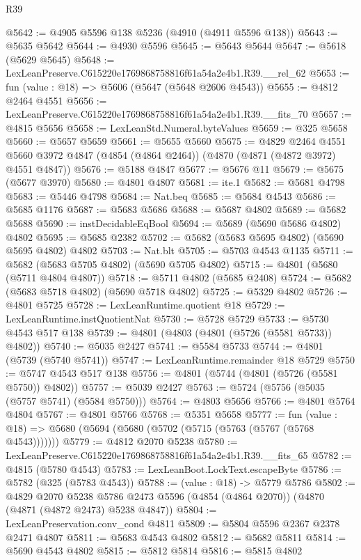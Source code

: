 \begin{lexlean}{R39}
\begin{coremodule}
@5642 := @4905 @5596 @138 @5236 (@4910 (@4911 @5596 @138))
@5643 := @5635 @5642
@5644 := @4930 @5596
@5645 := @5643 @5644
@5647 := @5618 (@5629 @5645)
@5648 := LexLeanPreserve.C615220e1769868758816f61a54a2e4b1.R39.__rel_62
@5653 := fun (value : @18) => @5606 (@5647 (@5648 @2606 @4543))
@5655 := @4812 @2464 @4551
@5656 := LexLeanPreserve.C615220e1769868758816f61a54a2e4b1.R39.__fits_70
@5657 := @4815 @5656
@5658 := LexLeanStd.Numeral.byteValues
@5659 := @325 @5658
@5660 := @5657 @5659
@5661 := @5655 @5660
@5675 := @4829
    @2464
    @4551
    @5660
    @3972
    @4847
    (@4854 (@4864 @2464))
    (@4870 (@4871 (@4872 @3972) @4551 @4847))
@5676 := @5188 @4847
@5677 := @5676 @11
@5679 := @5675 (@5677 @3970)
@5680 := @4801 @4807
@5681 := ite.{1}
@5682 := @5681 @4798
@5683 := @5446 @4798
@5684 := Nat.beq
@5685 := @5684 @4543
@5686 := @5685 @1176
@5687 := @5683 @5686
@5688 := @5687 @4802
@5689 := @5682 @5688
@5690 := instDecidableEqBool
@5694 := @5689 (@5690 @5686 @4802) @4802
@5695 := @5685 @2382
@5702 := @5682 (@5683 @5695 @4802) (@5690 @5695 @4802) @4802
@5703 := Nat.blt
@5705 := @5703 @4543 @1135
@5711 := @5682 (@5683 @5705 @4802) (@5690 @5705 @4802)
@5715 := @4801 (@5680 (@5711 @4804 @4807))
@5718 := @5711 @4802 (@5685 @2408)
@5724 := @5682 (@5683 @5718 @4802) (@5690 @5718 @4802)
@5725 := @5329 @4802
@5726 := @4801 @5725
@5728 := LexLeanRuntime.quotient @18
@5729 := LexLeanRuntime.instQuotientNat
@5730 := @5728 @5729
@5733 := @5730 @4543 @517 @138
@5739 := @4801 (@4803 (@4801 (@5726 (@5581 @5733)) @4802))
@5740 := @5035 @2427
@5741 := @5584 @5733
@5744 := @4801 (@5739 (@5740 @5741))
@5747 := LexLeanRuntime.remainder @18 @5729
@5750 := @5747 @4543 @517 @138
@5756 := @4801 (@5744 (@4801 (@5726 (@5581 @5750)) @4802))
@5757 := @5039 @2427
@5763 := @5724 (@5756 (@5035 (@5757 @5741) (@5584 @5750)))
@5764 := @4803 @5656
@5766 := @4801 @5764 @4804
@5767 := @4801 @5766
@5768 := @5351 @5658
@5777 := fun (value : @18) => @5680 (@5694 (@5680 (@5702 (@5715 (@5763 (@5767 (@5768 @4543)))))))
@5779 := @4812 @2070 @5238
@5780 := LexLeanPreserve.C615220e1769868758816f61a54a2e4b1.R39.__fits_65
@5782 := @4815 (@5780 @4543)
@5783 := LexLeanBoot.LockText.escapeByte
@5786 := @5782 (@325 (@5783 @4543))
@5788 := (value : @18) -> @5779 @5786
@5802 := @4829
    @2070
    @5238
    @5786
    @2473
    @5596
    (@4854 (@4864 @2070))
    (@4870 (@4871 (@4872 @2473) @5238 @4847))
@5804 := LexLeanPreservation.conv_cond @4811
@5809 := @5804 @5596 @2367 @2378 @2471 @4807
@5811 := @5683 @4543 @4802
@5812 := @5682 @5811
@5814 := @5690 @4543 @4802
@5815 := @5812 @5814
@5816 := @5815 @4802

\end{coremodule}
\end{lexlean}
